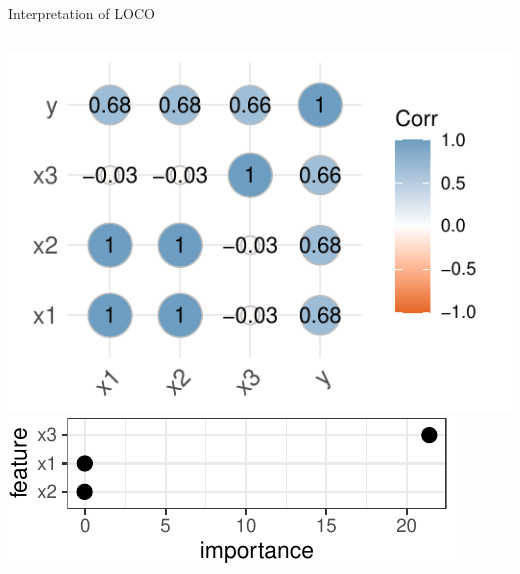 \documentclass[11pt,compress,t,notes=noshow, aspectratio=169, xcolor=table]{beamer}
\begin{document}
\begin{frame}{Interpretation of LOCO}
\begin{columns}[c]
\begin{column}{0.3\textwidth}
\includegraphics[width=\linewidth]{figure_man/simulation_loco_corr.pdf} 
\hfill
\includegraphics[width=\linewidth]{figure_man/simulation_loco}


\end{column}
\end{columns}


\end{frame}
\end{document}
